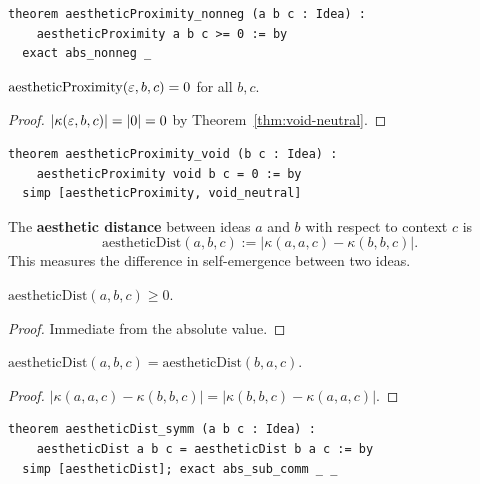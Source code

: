 \begin{lstlisting}
theorem aestheticProximity_nonneg (a b c : Idea) :
    aestheticProximity a b c >= 0 := by
  exact abs_nonneg _
\end{lstlisting}

\begin{theorem}
\label{thm:prox-void}
$\mathrm{aestheticProximity}(\varepsilon, b, c) = 0$ for all $b, c$.
\end{theorem}

\begin{proof}
$|\kappa(\varepsilon, b, c)| = |0| = 0$ by Theorem~\ref{thm:void-neutral}.
\end{proof}

\begin{lstlisting}
theorem aestheticProximity_void (b c : Idea) :
    aestheticProximity void b c = 0 := by
  simp [aestheticProximity, void_neutral]
\end{lstlisting}

\begin{definition}
\label{def:aesthetic-distance}
The \textbf{aesthetic distance} between ideas $a$ and $b$ with respect
to context $c$ is
\[
  \mathrm{aestheticDist}(a, b, c)
    := |\kappa(a, a, c) - \kappa(b, b, c)|.
\]
This measures the difference in self-emergence between two ideas.
\end{definition}

\begin{theorem}
\label{thm:aest-dist-nonneg}
$\mathrm{aestheticDist}(a, b, c) \geq 0$.
\end{theorem}

\begin{proof}
Immediate from the absolute value.
\end{proof}

\begin{theorem}
\label{thm:aest-dist-symm}
$\mathrm{aestheticDist}(a, b, c) = \mathrm{aestheticDist}(b, a, c)$.
\end{theorem}

\begin{proof}
$|\kappa(a, a, c) - \kappa(b, b, c)| = |\kappa(b, b, c) - \kappa(a, a, c)|$.
\end{proof}

\begin{lstlisting}
theorem aestheticDist_symm (a b c : Idea) :
    aestheticDist a b c = aestheticDist b a c := by
  simp [aestheticDist]; exact abs_sub_comm _ _
\end{lstlisting}

